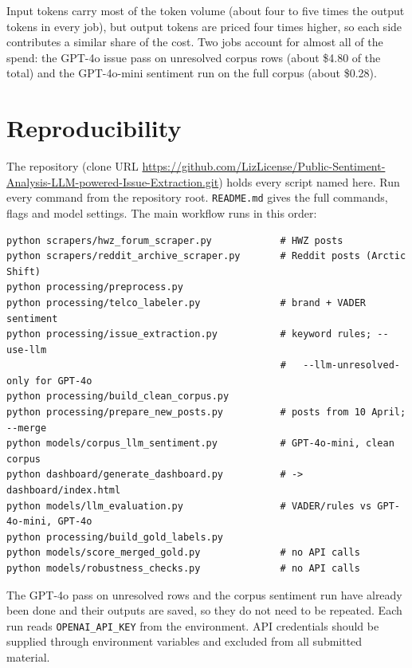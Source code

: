 \documentclass[11pt,a4paper]{article}
\begin{document}
Input tokens carry most of the token volume (about four to five times the output tokens in every job), but output tokens are priced four times higher, so each side contributes a similar share of the cost. Two jobs account for almost all of the spend: the GPT-4o issue pass on unresolved corpus rows (about \$4.80 of the total) and the GPT-4o-mini sentiment run on the full corpus (about \$0.28).

\section{Reproducibility}

The repository (clone URL \url{https://github.com/LizLicense/Public-Sentiment-Analysis-LLM-powered-Issue-Extraction.git}) holds every script named here. Run every command from the repository root. \texttt{README.md} gives the full commands, flags and model settings. The main workflow runs in this order:

\begin{verbatim}
python scrapers/hwz_forum_scraper.py            # HWZ posts
python scrapers/reddit_archive_scraper.py       # Reddit posts (Arctic Shift)
python processing/preprocess.py
python processing/telco_labeler.py              # brand + VADER sentiment
python processing/issue_extraction.py           # keyword rules; --use-llm
                                                #   --llm-unresolved-only for GPT-4o
python processing/build_clean_corpus.py
python processing/prepare_new_posts.py          # posts from 10 April; --merge
python models/corpus_llm_sentiment.py           # GPT-4o-mini, clean corpus
python dashboard/generate_dashboard.py          # -> dashboard/index.html
python models/llm_evaluation.py                 # VADER/rules vs GPT-4o-mini, GPT-4o
python processing/build_gold_labels.py
python models/score_merged_gold.py              # no API calls
python models/robustness_checks.py              # no API calls
\end{verbatim}

The GPT-4o pass on unresolved rows and the corpus sentiment run have already been done and their outputs are saved, so they do not need to be repeated. Each run reads \texttt{OPENAI\_API\_KEY} from the environment. API credentials should be supplied through environment variables and excluded from all submitted material.
\end{document}
